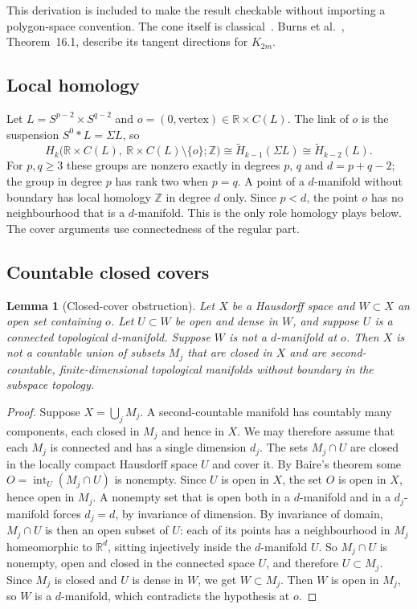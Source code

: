 \documentclass[11pt,a4paper]{article}
\newtheorem{lemma}[theorem]{Lemma}
\theoremstyle{definition}\newtheorem{conjecture}{Conjecture}
\theoremstyle{remark}\newtheorem{remark}[theorem]{Remark}
\newcommand{\R}{\mathbb R}
\newcommand{\Z}{\mathbb Z}
\DeclareMathOperator{\interior}{int}
\begin{document}
This derivation is included to make the result checkable without importing a polygon-space convention. The cone itself is classical~\cite{kamiyama,kapovichmillson}. Burns et al.~\cite{burns}, Theorem~16.1, describe its tangent directions for $K_{2m}$.

\subsection{Local homology}
Let $L=S^{p-2}\times S^{q-2}$ and $o=(0,\text{vertex})\in\R\times C(L)$. The link of $o$ is the suspension $S^0*L=\Sigma L$, so
\begin{equation}\label{eq:homology}
 H_k\bigl(\R\times C(L),\ \R\times C(L)\setminus\{o\};\Z\bigr)\cong\widetilde H_{k-1}(\Sigma L)\cong\widetilde H_{k-2}(L).
\end{equation}
For $p,q\ge3$ these groups are nonzero exactly in degrees $p$, $q$ and $d=p+q-2$; the group in degree $p$ has rank two when $p=q$. A point of a $d$-manifold without boundary has local homology $\Z$ in degree $d$ only. Since $p<d$, the point $o$ has no neighbourhood that is a $d$-manifold. This is the only role homology plays below. The cover arguments use connectedness of the regular part.

\subsection{Countable closed covers}

\begin{lemma}[Closed-cover obstruction]\label{lem:cover}
Let $X$ be a Hausdorff space and $W\subset X$ an open set containing $o$. Let $U\subset W$ be open and dense in $W$, and suppose $U$ is a connected topological $d$-manifold. Suppose $W$ is not a $d$-manifold at $o$. Then $X$ is not a countable union of subsets $M_j$ that are closed in $X$ and are second-countable, finite-dimensional topological manifolds without boundary in the subspace topology.
\end{lemma}
\begin{proof}
Suppose $X=\bigcup_jM_j$. A second-countable manifold has countably many components, each closed in $M_j$ and hence in $X$. We may therefore assume that each $M_j$ is connected and has a single dimension $d_j$. The sets $M_j\cap U$ are closed in the locally compact Hausdorff space $U$ and cover it. By Baire's theorem some $O=\interior_U(M_j\cap U)$ is nonempty. Since $U$ is open in $X$, the set $O$ is open in $X$, hence open in $M_j$. A nonempty set that is open both in a $d$-manifold and in a $d_j$-manifold forces $d_j=d$, by invariance of dimension. By invariance of domain, $M_j\cap U$ is then an open subset of $U$: each of its points has a neighbourhood in $M_j$ homeomorphic to $\R^d$, sitting injectively inside the $d$-manifold $U$. So $M_j\cap U$ is nonempty, open and closed in the connected space $U$, and therefore $U\subset M_j$. Since $M_j$ is closed and $U$ is dense in $W$, we get $W\subset M_j$. Then $W$ is open in $M_j$, so $W$ is a $d$-manifold, which contradicts the hypothesis at $o$.
\end{proof}
\end{document}
